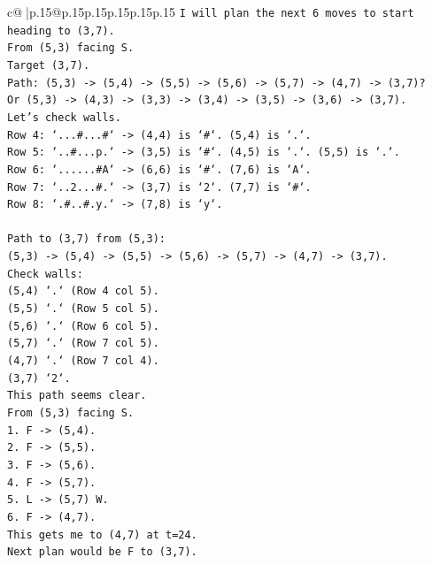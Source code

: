 \documentclass{article}
\begin{document}
{\begin{supertabular}{c@{$\;$}|p{.15\linewidth}@{}p{.15\linewidth}p{.15\linewidth}p{.15\linewidth}p{.15\linewidth}p{.15\linewidth}}
{{{\texttt{I will plan the next 6 moves to start heading to (3,7).} \\
\texttt{From (5,3) facing S.} \\
\texttt{Target (3,7).} \\
\texttt{Path: (5,3) {-}> (5,4) {-}> (5,5) {-}> (5,6) {-}> (5,7) {-}> (4,7) {-}> (3,7)?} \\
\texttt{Or (5,3) {-}> (4,3) {-}> (3,3) {-}> (3,4) {-}> (3,5) {-}> (3,6) {-}> (3,7).} \\
\texttt{Let's check walls.} \\
\texttt{Row 4: `...\#...\#` {-}> (4,4) is `\#`. (5,4) is `.`.} \\
\texttt{Row 5: `..\#...p.` {-}> (3,5) is `\#`. (4,5) is `.`. (5,5) is `.`.} \\
\texttt{Row 6: `......\#A` {-}> (6,6) is `\#`. (7,6) is `A`.} \\
\texttt{Row 7: `..2...\#.` {-}> (3,7) is `2`. (7,7) is `\#`.} \\
\texttt{Row 8: `.\#..\#.y.` {-}> (7,8) is `y`.} \\
\\ 
\texttt{Path to (3,7) from (5,3):} \\
\texttt{(5,3) {-}> (5,4) {-}> (5,5) {-}> (5,6) {-}> (5,7) {-}> (4,7) {-}> (3,7).} \\
\texttt{Check walls:} \\
\texttt{(5,4) `.` (Row 4 col 5).} \\
\texttt{(5,5) `.` (Row 5 col 5).} \\
\texttt{(5,6) `.` (Row 6 col 5).} \\
\texttt{(5,7) `.` (Row 7 col 5).} \\
\texttt{(4,7) `.` (Row 7 col 4).} \\
\texttt{(3,7) `2`.} \\
\texttt{This path seems clear.} \\
\texttt{From (5,3) facing S.} \\
\texttt{1. F {-}> (5,4).} \\
\texttt{2. F {-}> (5,5).} \\
\texttt{3. F {-}> (5,6).} \\
\texttt{4. F {-}> (5,7).} \\
\texttt{5. L {-}> (5,7) W.} \\
\texttt{6. F {-}> (4,7).} \\
\texttt{This gets me to (4,7) at t=24.} \\
\texttt{Next plan would be F to (3,7).} \\
\\ 
}}}
\end{supertabular}}
\end{document}
